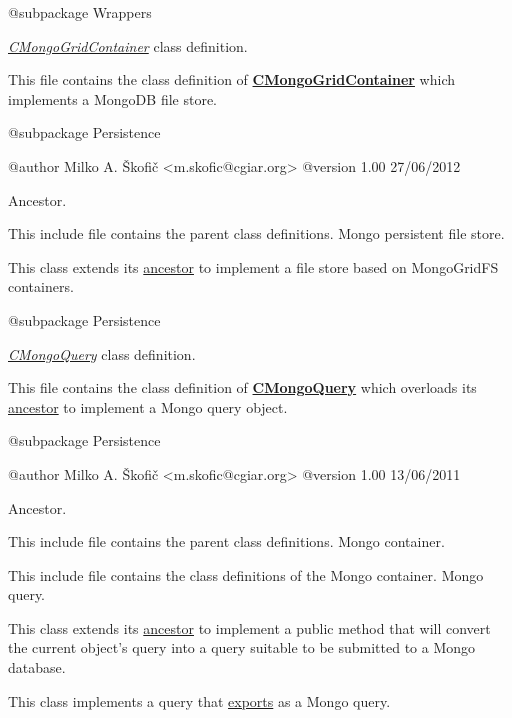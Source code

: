 \begin{DoxyVerb} @subpackage        Wrappers\end{DoxyVerb}


{\itshape \hyperlink{class_c_mongo_grid_container}{C\-Mongo\-Grid\-Container}} class definition.

This file contains the class definition of {\bfseries \hyperlink{class_c_mongo_grid_container}{C\-Mongo\-Grid\-Container}} which implements a Mongo\-D\-B file store.

\begin{DoxyVerb} @subpackage        Persistence

 @author            Milko A. Škofič <m.skofic@cgiar.org>
 @version   1.00 27/06/2012\end{DoxyVerb}


Ancestor.

This include file contains the parent class definitions. Mongo persistent file store.

This class extends its \hyperlink{class_c_mongo_container}{ancestor} to implement a file store based on Mongo\-Grid\-F\-S containers.

\begin{DoxyVerb} @subpackage        Persistence\end{DoxyVerb}


{\itshape \hyperlink{class_c_mongo_query}{C\-Mongo\-Query}} class definition.

This file contains the class definition of {\bfseries \hyperlink{class_c_mongo_query}{C\-Mongo\-Query}} which overloads its \hyperlink{class_c_query}{ancestor} to implement a Mongo query object.

\begin{DoxyVerb} @subpackage        Persistence

 @author            Milko A. Škofič <m.skofic@cgiar.org>
 @version   1.00 13/06/2011\end{DoxyVerb}


Ancestor.

This include file contains the parent class definitions. Mongo container.

This include file contains the class definitions of the Mongo container. Mongo query.

This class extends its \hyperlink{class_c_query}{ancestor} to implement a public method that will convert the current object's query into a query suitable to be submitted to a Mongo database.

This class implements a query that \hyperlink{}{exports} as a Mongo query.

